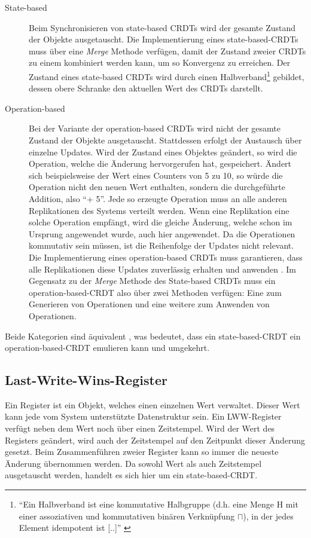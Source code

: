 \documentclass[a4paper, 12pt]{scrreprt}
\begin{document}
\begin{description}
\label{sec:stateopbased}
	\item[State-based]
	Beim Synchronisieren von state-based \acp{CRDT} wird der gesamte Zustand der Objekte ausgetauscht. Die Implementierung eines state-based-CRDTs muss über eine \textit{Merge} Methode verfügen, damit der Zustand zweier \acp{CRDT} zu einem kombiniert werden kann, um so Konvergenz zu erreichen. Der Zustand eines state-based \acp{CRDT} wird durch einen Halbverband\footnote{\enquote{Ein Halbverband ist eine kommutative Halbgruppe (d.h. eine Menge H mit einer assoziativen und kommutativen binären Verknüpfung $\sqcap$), in der jedes Element idempotent ist [..]} \autocite{MiscHalbverband}} gebildet, dessen obere Schranke den aktuellen Wert des \acp{CRDT} darstellt. \autocite{InproceedingsStateBased}
	
	\item[Operation-based]
	Bei der Variante der operation-based \acp{CRDT} wird nicht der gesamte Zustand der Objekte ausgetauscht. Stattdessen erfolgt der Austausch über einzelne Updates. Wird der Zustand eines Objektes geändert, so wird die Operation, welche die Änderung hervorgerufen hat, gespeichert. Ändert sich beispielsweise der Wert eines Counters von 5 zu 10, so würde die Operation nicht den neuen Wert enthalten, sondern die durchgeführte Addition, also \enquote{+ 5}. Jede so erzeugte Operation muss an alle anderen Replikationen des Systems verteilt werden. Wenn eine Replikation eine solche Operation empfängt, wird die gleiche Änderung, welche schon im Ursprung angewendet wurde, auch hier angewendet. Da die Operationen kommutativ sein müssen, ist die Reihenfolge der Updates nicht relevant. Die Implementierung eines operation-based \acp{CRDT} muss garantieren, dass alle Replikationen diese Updates zuverlässig erhalten und anwenden \autocite[S.18-19]{ArticleCRDTOverview}. Im Gegensatz zu der \textit{Merge} Methode des State-based \acp{CRDT} muss ein operation-based-CRDT also über zwei Methoden verfügen: Eine zum Generieren von Operationen und eine weitere zum Anwenden von Operationen.
\end{description} 

Beide Kategorien sind äquivalent \autocite[S. 9]{InproceedingsCRDTOriginal}, was bedeutet, dass ein state-based-CRDT ein operation-based-CRDT emulieren kann und umgekehrt.


\subsection{Last-Write-Wins-Register}
\label{sec:lwwRegister}
\sloppypar
Ein Register ist ein Objekt, welches einen einzelnen Wert verwaltet. Dieser Wert kann jede vom System unterstützte Datenstruktur sein. Ein \ac{LWW-Register} verfügt neben dem Wert noch über einen Zeitstempel. Wird der Wert des Registers geändert, wird auch der Zeitstempel auf den Zeitpunkt dieser Änderung gesetzt. Beim Zusammenführen zweier Register kann so immer die neueste Änderung übernommen werden. Da sowohl Wert als auch Zeitstempel ausgetauscht werden, handelt es sich hier um ein state-based-CRDT.
\end{document}
